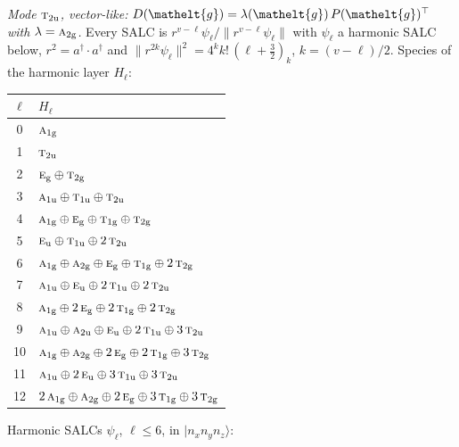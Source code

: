 \documentclass[11pt]{article}
\newcommand{\eltfont}[1]{{\let\sigma\eltsigma\mathelt{#1}}}
\newcommand{\irr}[1]{\text{\normalfont\scshape #1}}
\newcommand{\elt}[1]{\eltfont{#1}}
\newcommand{\ptag}[1]{\mathrm{#1}}
\newcommand{\occ}[1]{\lvert #1\rangle}
\newcommand{\gel}{\elt{g}}             %
\newcommand{\gmat}{P(\gel)^{\top}}     %
\begin{document}
\emph{Mode $\irr{t}_{2\ptag{u}}$, vector-like: $D(\gel)=\lambda(\gel)\,\gmat$ with $\lambda=\irr{a}_{2\ptag{g}}$.} Every SALC is $r^{v-\ell}\psi_\ell/\lVert r^{v-\ell}\psi_\ell\rVert$ with $\psi_\ell$ a harmonic SALC below, $r^2=a^\dagger\!\cdot a^\dagger$ and $\lVert r^{2k}\psi_\ell\rVert^2=4^kk!\,(\ell+\tfrac32)_k$, $k=(v-\ell)/2$. Species of the harmonic layer $H_\ell$:
\begin{longtable}{c l}\hline $\ell$ & $H_\ell$\\ \hline\endhead
0 & $\irr{a}_{1\ptag{g}}$\\
1 & $\irr{t}_{2\ptag{u}}$\\
2 & $\irr{e}_{\ptag{g}}\oplus \irr{t}_{2\ptag{g}}$\\
3 & $\irr{a}_{1\ptag{u}}\oplus \irr{t}_{1\ptag{u}}\oplus \irr{t}_{2\ptag{u}}$\\
4 & $\irr{a}_{1\ptag{g}}\oplus \irr{e}_{\ptag{g}}\oplus \irr{t}_{1\ptag{g}}\oplus \irr{t}_{2\ptag{g}}$\\
5 & $\irr{e}_{\ptag{u}}\oplus \irr{t}_{1\ptag{u}}\oplus 2\,\irr{t}_{2\ptag{u}}$\\
6 & $\irr{a}_{1\ptag{g}}\oplus \irr{a}_{2\ptag{g}}\oplus \irr{e}_{\ptag{g}}\oplus \irr{t}_{1\ptag{g}}\oplus 2\,\irr{t}_{2\ptag{g}}$\\
7 & $\irr{a}_{1\ptag{u}}\oplus \irr{e}_{\ptag{u}}\oplus 2\,\irr{t}_{1\ptag{u}}\oplus 2\,\irr{t}_{2\ptag{u}}$\\
8 & $\irr{a}_{1\ptag{g}}\oplus 2\,\irr{e}_{\ptag{g}}\oplus 2\,\irr{t}_{1\ptag{g}}\oplus 2\,\irr{t}_{2\ptag{g}}$\\
9 & $\irr{a}_{1\ptag{u}}\oplus \irr{a}_{2\ptag{u}}\oplus \irr{e}_{\ptag{u}}\oplus 2\,\irr{t}_{1\ptag{u}}\oplus 3\,\irr{t}_{2\ptag{u}}$\\
10 & $\irr{a}_{1\ptag{g}}\oplus \irr{a}_{2\ptag{g}}\oplus 2\,\irr{e}_{\ptag{g}}\oplus 2\,\irr{t}_{1\ptag{g}}\oplus 3\,\irr{t}_{2\ptag{g}}$\\
11 & $\irr{a}_{1\ptag{u}}\oplus 2\,\irr{e}_{\ptag{u}}\oplus 3\,\irr{t}_{1\ptag{u}}\oplus 3\,\irr{t}_{2\ptag{u}}$\\
12 & $2\,\irr{a}_{1\ptag{g}}\oplus \irr{a}_{2\ptag{g}}\oplus 2\,\irr{e}_{\ptag{g}}\oplus 3\,\irr{t}_{1\ptag{g}}\oplus 3\,\irr{t}_{2\ptag{g}}$\\
\hline\end{longtable}
Harmonic SALCs $\psi_\ell$, $\ell\le6$, in $\occ{n_xn_yn_z}$:
\end{document}
